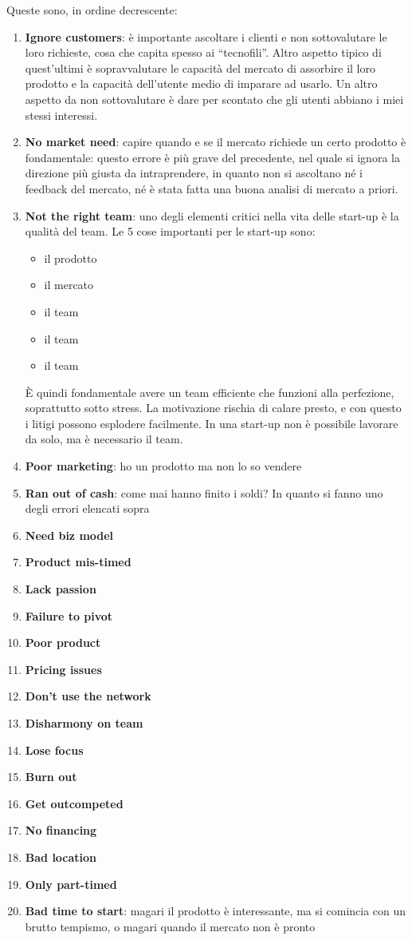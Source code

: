 Queste sono, in ordine decrescente:
\begin{enumerate}
 \item \textbf{Ignore customers}: è importante ascoltare i clienti e non
 sottovalutare le loro richieste, cosa che capita spesso ai ``tecnofili''.
 Altro aspetto tipico di quest'ultimi è sopravvalutare le capacità del mercato
 di assorbire il loro prodotto e la capacità dell'utente medio di imparare ad
 usarlo. Un altro aspetto da non sottovalutare è dare per scontato che gli
 utenti abbiano i miei stessi interessi.
 \item \textbf{No market need}: capire quando e se il mercato richiede un certo
 prodotto è fondamentale: questo errore è più grave del precedente, nel quale
 si ignora la direzione più giusta da intraprendere, in quanto non si ascoltano
 né i feedback del mercato, né è stata fatta una buona analisi di mercato a
 priori.
 \item \textbf{Not the right team}: uno degli elementi critici nella vita delle
start-up è la qualità del team. Le 5 cose importanti per le start-up sono:
\begin{itemize}
 \item il prodotto
 \item il mercato
 \item il team
 \item il team
 \item il team
\end{itemize}
  È quindi fondamentale avere un team efficiente che funzioni alla perfezione,
soprattutto sotto stress. La motivazione rischia di calare presto, e con questo
i litigi possono esplodere facilmente. In una start-up non è possibile lavorare
da solo, ma è necessario il team.
 \item \textbf{Poor marketing}: ho un prodotto ma non lo so vendere
 \item \textbf{Ran out of cash}: come mai hanno finito i soldi? In quanto si
 fanno uno degli errori elencati sopra
 \item \textbf{Need biz model}
 \item \textbf{Product mis-timed}
 \item \textbf{Lack passion}
 \item \textbf{Failure to pivot}
 \item \textbf{Poor product}
 \item \textbf{Pricing issues}
 \item \textbf{Don't use the network}
 \item \textbf{Disharmony on team}
 \item \textbf{Lose focus}
 \item \textbf{Burn out}
 \item \textbf{Get outcompeted}
 \item \textbf{No financing}
 \item \textbf{Bad location}
 \item \textbf{Only part-timed}
 \item \textbf{Bad time to start}: magari il prodotto è interessante, ma si
 comincia con un brutto tempismo, o magari quando il mercato non è pronto
\end{enumerate}

